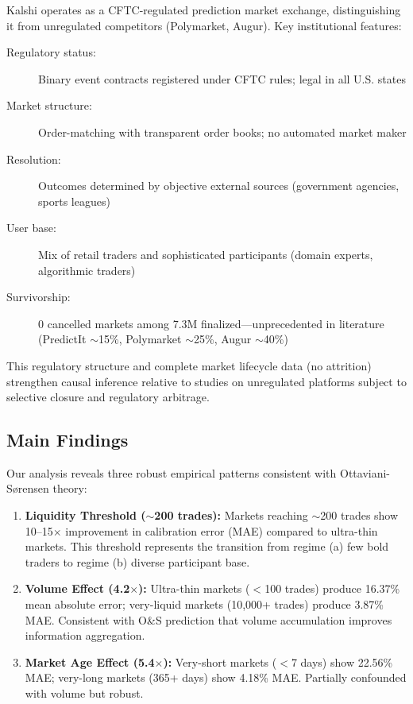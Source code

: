 \documentclass[a4paper,11pt]{article}
\theoremstyle{plain}
\theoremstyle{definition}
\theoremstyle{remark}
\begin{document}
Kalshi operates as a CFTC-regulated prediction market exchange, distinguishing it from unregulated competitors (Polymarket, Augur). Key institutional features:

\begin{description}
    \item[Regulatory status:] Binary event contracts registered under CFTC rules; legal in all U.S. states
    \item[Market structure:] Order-matching with transparent order books; no automated market maker
    \item[Resolution:] Outcomes determined by objective external sources (government agencies, sports leagues)
    \item[User base:] Mix of retail traders and sophisticated participants (domain experts, algorithmic traders)
    \item[Survivorship:] 0 cancelled markets among 7.3M finalized---unprecedented in literature (PredictIt $\sim$15\%, Polymarket $\sim$25\%, Augur $\sim$40\%)
\end{description}

This regulatory structure and complete market lifecycle data (no attrition) strengthen causal inference relative to studies on unregulated platforms subject to selective closure and regulatory arbitrage.

\subsection{Main Findings}
\label{subsec:findings}

Our analysis reveals three robust empirical patterns consistent with Ottaviani-Sørensen theory:

\begin{enumerate}
    \item \textbf{Liquidity Threshold ($\sim$200 trades):} Markets reaching $\sim$200 trades show 10--15$\times$ improvement in calibration error (MAE) compared to ultra-thin markets. This threshold represents the transition from regime (a) few bold traders to regime (b) diverse participant base.
    
    \item \textbf{Volume Effect (4.2$\times$):} Ultra-thin markets ($<$100 trades) produce 16.37\% mean absolute error; very-liquid markets (10,000+ trades) produce 3.87\% MAE. Consistent with O\&S prediction that volume accumulation improves information aggregation.
    
    \item \textbf{Market Age Effect (5.4$\times$):} Very-short markets ($<$7 days) show 22.56\% MAE; very-long markets (365+ days) show 4.18\% MAE. Partially confounded with volume but robust.
\end{enumerate}
\end{document}
